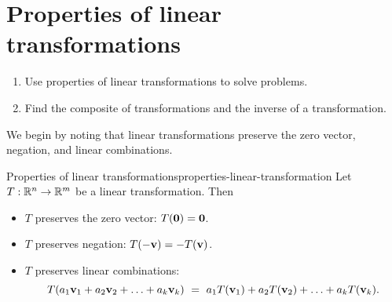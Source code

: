 \section{Properties of linear transformations}

\begin{outcome}
  \begin{enumerate}
  \item Use properties of linear transformations to solve problems.
  \item Find the composite of transformations and the inverse of a
    transformation.
  \end{enumerate}
\end{outcome}

We begin by noting that linear transformations preserve the zero
vector, negation, and linear combinations.

\begin{proposition}{Properties of linear transformations}{properties-linear-transformation}
  Let $T: \mathbb{R}^n \to \mathbb{R}^m$ be a linear transformation. Then
  \begin{itemize}
  \item $T$ preserves the zero vector: $T(\mbox{\bf 0}) = \mbox{\bf 0}$.
  \item $T$ preserves negation: $T(-\mbox{\bf v}) = -T(\mbox{\bf v})$.
  \item $T$ preserves linear combinations:
    \begin{equation*}
      T(a_1\mbox{\bf v}_1 + a_2\mbox{\bf v}_2 + \ldots + a_k \mbox{\bf v}_k)
      ~=~
      a_1T(\mbox{\bf v}_1) + a_2T(\mbox{\bf v}_2) + \ldots + a_k T(\mbox{\bf v}_k).
    \end{equation*}
  \end{itemize}
\end{proposition}

